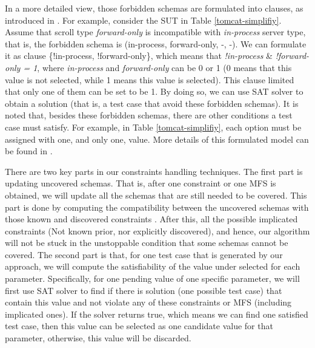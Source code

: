 \documentclass[10pt,journal,compsoc]{IEEEtran}
\begin{document}
In a more detailed view, those forbidden schemas are formulated into clauses, as introduced in \cite{cohen2008constructing}. For example, consider the SUT in Table \ref{tomcat-simplifiy}. Assume that scroll type \emph{forward-only} is incompatible with \emph{in-process} server type, that is, the forbidden schema is (in-process, forward-only, -, -). We can formulate it as clause \{!in-process, !forward-only\}, which means that \emph{ !in-process} \&  \emph{!forward-only = 1}, where \emph{in-process} and \emph{forward-only} can be 0 or 1 (0 means that this value is not selected, while 1 means this value is selected). This clause limited that only one of them can be set to be 1.  By doing so, we can use SAT solver \cite{Berkelaar2004} to obtain a solution (that is, a test case that avoid these forbidden schemas). It is noted that, besides these forbidden schemas, there are other conditions a test case must satisfy. For example, in Table \ref{tomcat-simplifiy}, each option must be assigned with one, and only one, value. More details of this formulated model can be found in \cite{cohen2008constructing,cohen2007exploiting}.

{\color{blue} There are two key parts in our constraints handling techniques. The first part is updating uncovered schemas. That is, after one constraint or one MFS is obtained, we will update all the schemas that are still needed to be covered.  This part is done by computing the compatibility between the uncovered schemas with those known and discovered constraints \cite{cohen2008constructing}.  After this, all the possible implicated constraints (Not known prior, nor explicitly discovered), and hence, our algorithm will not be stuck in the unstoppable condition that some schemas cannot be covered. The second part is that, for one test case that is generated by our approach, we will compute the satisfiability of the value under selected for each parameter. Specifically, for one pending value of one specific parameter, we will first use SAT solver to find if there is solution (one possible test case) that contain this value and not violate any of these constraints or MFS (including implicated ones). If the solver returns true, which means we can find one satisfied test case, then this value can be selected as one candidate value for that parameter, otherwise, this value will be discarded. }

%
\end{document}
